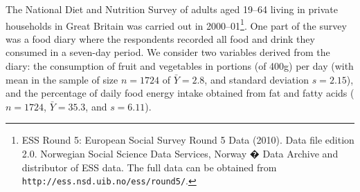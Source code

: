 \documentclass[11pt,a4paper,openany]{book}
\let\rmarkdownfootnote\footnote%
\def\footnote{\protect\rmarkdownfootnote}
\begin{document}
The National Diet and Nutrition Survey of adults aged 19--64 living in
private households in Great Britain was carried out in
2000--01\footnote{ESS Round 5: European Social Survey Round 5 Data
  (2010). Data file edition 2.0. Norwegian Social Science Data Services,
  Norway � Data Archive and distributor of ESS data. The full data can
  be obtained from \texttt{http://ess.nsd.uib.no/ess/round5/}.}. One
part of the survey was a food diary where the respondents recorded all
food and drink they consumed in a seven-day period. We consider two
variables derived from the diary: the consumption of fruit and
vegetables in portions (of 400g) per day (with mean in the sample of
size \(n=1724\) of \(\bar{Y}=2.8\), and standard deviation \(s=2.15\)),
and the percentage of daily food energy intake obtained from fat and
fatty acids (\(n=1724\), \(\bar{Y}=35.3\), and \(s=6.11\)).
\end{document}

